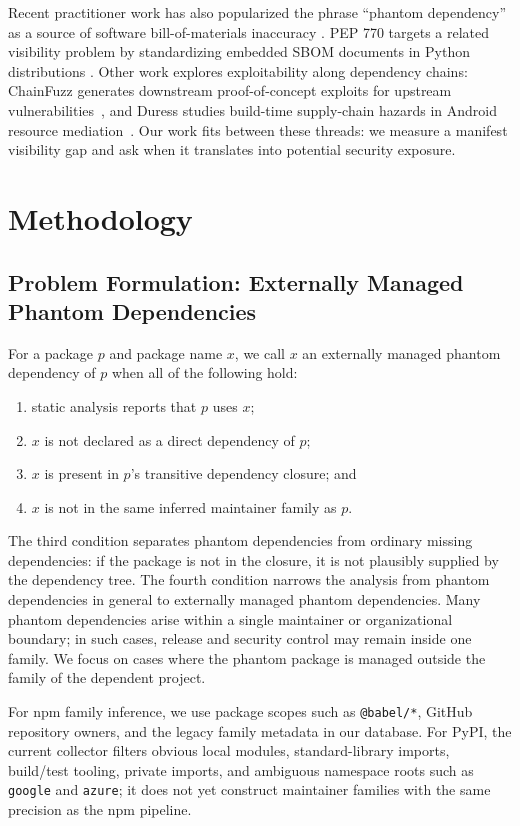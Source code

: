 \documentclass[letterpaper,twocolumn,10pt]{article}
\newcommand{\npm}{npm\xspace}
\newcommand{\pypi}{PyPI\xspace}
\begin{document}
Recent practitioner work has also popularized the phrase ``phantom
dependency'' as a source of software bill-of-materials inaccuracy
\cite{endor2023phantom}.  PEP 770 targets a related visibility problem by
standardizing embedded SBOM documents in Python distributions
\cite{pep770}.  Other work explores exploitability along dependency chains:
ChainFuzz generates downstream proof-of-concept exploits for upstream
vulnerabilities~\cite{chainfuzz2025}, and Duress studies build-time supply-chain
hazards in Android resource mediation~\cite{duress2023}.  Our work fits between
these threads: we measure a manifest visibility gap and ask when it translates
into potential security exposure.

\section{Methodology}

\subsection{Problem Formulation: Externally Managed Phantom Dependencies}

For a package $p$ and package name $x$, we call $x$ an externally managed
phantom dependency of $p$ when all of the following hold:
\begin{enumerate}[leftmargin=*]
  \item static analysis reports that $p$ uses $x$;
  \item $x$ is not declared as a direct dependency of $p$;
  \item $x$ is present in $p$'s transitive dependency closure; and
  \item $x$ is not in the same inferred maintainer family as $p$.
\end{enumerate}

The third condition separates phantom dependencies from ordinary missing
dependencies: if the package is not in the closure, it is not plausibly supplied
by the dependency tree.  The fourth condition narrows the analysis from phantom
dependencies in general to externally managed phantom dependencies.  Many
phantom dependencies arise within a single maintainer or organizational
boundary; in such cases, release and security control may remain inside one
family.  We focus on cases where the phantom package is managed outside the
family of the dependent project.

For \npm family inference, we use package scopes such as
\texttt{@babel/*}, GitHub repository owners, and the legacy family metadata in
our database.  For \pypi, the current collector filters obvious local modules,
standard-library imports, build/test tooling, private imports, and ambiguous
namespace roots such as \texttt{google} and \texttt{azure}; it does not yet
construct maintainer families with the same precision as the \npm pipeline.
\end{document}
